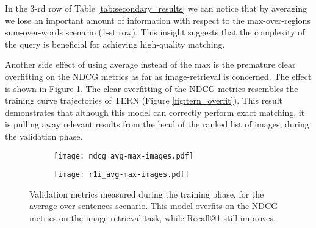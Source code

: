 \documentclass[acmsmall]{acmart}
\newcommand{\majorrevised}[1]{#1}
\begin{document}
In the 3-rd row of Table \ref{tab:secondary_results} we can notice that by averaging we lose an important amount of information with respect to the max-over-regions sum-over-words scenario (1-st row). This insight suggests that the complexity of the query is beneficial for achieving high-quality matching. 

Another side effect of using average instead of the max is the premature clear overfitting on the NDCG metrics as far as image-retrieval is concerned. The effect is shown in Figure \ref{fig:overfit}. \majorrevised{The clear overfitting of the NDCG metrics resembles the training curve trajectories of TERN (Figure \ref{fig:tern_overfit})}. This result demonstrates that although this model can correctly perform exact matching, it is pulling away relevant results from the head of the ranked list of images, during the validation phase. 


\begin{figure}[t]
\begin{subfigure}[b]{0.49\textwidth}
\centering
\texttt{[image: ndcg\_avg-max-images.pdf]}
\end{subfigure}
\begin{subfigure}[b]{0.476\textwidth}
\centering
\texttt{[image: r1i\_avg-max-images.pdf]}
\end{subfigure}
\caption{Validation metrics measured during the training phase, for the  average-over-sentences scenario. This model overfits on the NDCG metrics on the image-retrieval task, while Recall@1 still improves.}
\label{fig:overfit}       \end{figure}
\end{document}
